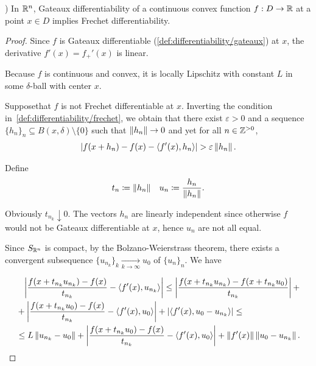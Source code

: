 \begin{theorem}\label{thm:rn_continuous_convex_gateaux_implies_frechet}\cite[exercise 1.15(a]{Phelps1993})
  In $\mathbb R^n$, Gateaux differentiability of a continuous convex function $f: D \to \mathbb R$ at a point $x \in D$ implies Frechet differentiability.
\end{theorem}
\begin{proof}
  Since $f$ is Gateaux differentiable (\cref{def:differentiability/gateaux}) at $x$, the derivative $f'(x) = f_+'(x)$ is linear.

  Because $f$ is continuous and convex, it is locally Lipschitz with constant $L$ in some $\delta$-ball with center $x$.

  Suppose\LEM that $f$ is not Frechet differentiable at $x$. Inverting the condition in~\cref{def:differentiability/frechet}, we obtain that there exist $\varepsilon > 0$ and a sequence $\{ h_n \}_n \subseteq B(x, \delta) \setminus \{ 0 \}$ such that $\left\Vert h_n \right\Vert \to 0$ and yet for all $n \in \mathbb Z^{>0}$,
  \begin{align}\label{thm:rn_continuous_convex_gateaux_implies_frechet/frechet_assumption}
    \left\vert f(x + h_n) - f(x) - \left\langle f'(x), h_n \right\rangle \right\vert > \varepsilon \left\Vert h_n \right\Vert.
  \end{align}

  Define
  \begin{align*}
    t_n \coloneqq \left\Vert h_n \right\Vert
    &&
    u_n \coloneqq \frac{h_n} {\left\Vert h_n \right\Vert}.
  \end{align*}

  Obviously $t_{n_k} \downarrow 0$. The vectors $h_n$ are linearly independent since otherwise $f$ would not be Gateaux differentiable at $x$, hence $u_n$ are not all equal.

  Since $S_{\mathbb R^n}$ is compact\USC, by the Bolzano-Weierstrass theorem, there exists a convergent subsequence $\{ u_{n_k} \}_k \underset {k \to \infty} \to u_0$ of $\{ u_n \}_n$. We have

  \begin{align}\label{thm:rn_continuous_convex_gateaux_implies_frechet/frechet_estimate}
    &\phantom= \Abs{\frac {f(x + t_{n_k} u_{n_k}) - f(x)} {t_{n_k}} - \Prod{f'(x)} {u_{n_k}}}
    \leq \nonumber
    \Abs{\frac {f(x + t_{n_k} u_{n_k}) - f(x + t_{n_k} u_0)} {t_{n_k}}} + \\ &+ \Abs{\frac {f(x + t_{n_k} u_0) - f(x)} {t_{n_k}} - \Prod{f'(x)} {u_0}} + \Abs{\Prod{f'(x)} {u_0 - u_{n_k}}}
    \leq \nonumber \\ &\leq
    L \Norm{u_{n_k} - u_0} + \Abs{\frac {f(x + t_{n_k} u_0) - f(x)} {t_{n_k}} - \Prod{f'(x)} {u_0}} + \Norm{f'(x)} \Norm{u_0 - u_{n_k}}.
  \end{align}


\end{proof}
